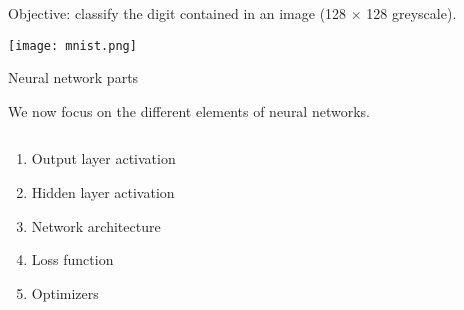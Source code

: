 \documentclass[
  10pt,
  ignorenonframetext,
]{beamer}
\providecommand{\tightlist}{%
  \setlength{\itemsep}{0pt}\setlength{\parskip}{0pt}}
\begin{document}
\begin{frame}
Objective: classify the digit contained in an image (128 \(\times\) 128
greyscale).

\texttt{[image: mnist.png]}
\end{frame}

\begin{frame}
\begin{block}{Neural network parts}
\protect\hypertarget{neural-network-parts}{}
\(~\)

We now focus on the different elements of neural networks.

\(~\)

\begin{enumerate}
[1)]
\tightlist
\item
  Output layer activation
\end{enumerate}

\vspace{2mm}

\begin{enumerate}
[1)]
\setcounter{enumi}{1}
\tightlist
\item
  Hidden layer activation
\end{enumerate}

\vspace{2mm}

\begin{enumerate}
[1)]
\setcounter{enumi}{2}
\tightlist
\item
  Network architecture
\end{enumerate}

\vspace{2mm}

\begin{enumerate}
[1)]
\setcounter{enumi}{3}
\tightlist
\item
  Loss function
\end{enumerate}

\vspace{2mm}

\begin{enumerate}
[1)]
\setcounter{enumi}{4}
\tightlist
\item
  Optimizers
\end{enumerate}
\end{block}
\end{frame}
\end{document}
